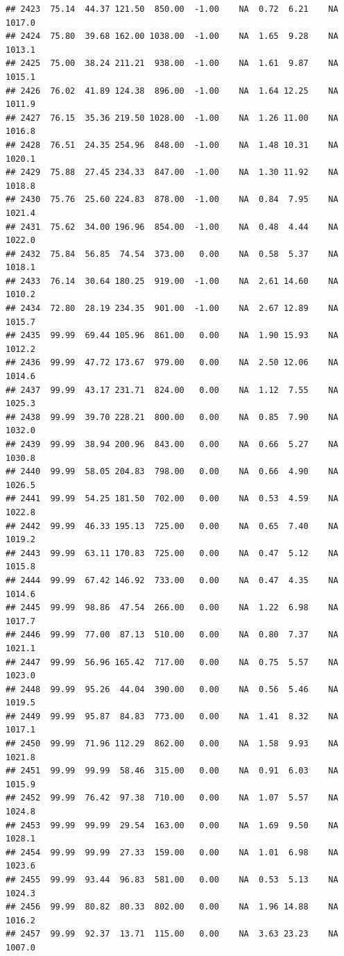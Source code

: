 \documentclass{article}\usepackage{graphicx, color}
\makeatletter
\newenvironment{kframe}{%
 \def\at@end@of@kframe{}%
 \ifinner\ifhmode%
  \def\at@end@of@kframe{\end{minipage}}%
  \begin{minipage}{\columnwidth}%
 \fi\fi%
 \def\FrameCommand##1{\hskip\@totalleftmargin \hskip-\fboxsep
 \colorbox{shadecolor}{##1}\hskip-\fboxsep
     \hskip-\linewidth \hskip-\@totalleftmargin \hskip\columnwidth}%
 \MakeFramed {\advance\hsize-\width
   \@totalleftmargin\z@ \linewidth\hsize
   \@setminipage}}%
 {\par\unskip\endMakeFramed%
 \at@end@of@kframe}
\newenvironment{knitrout}{}{} %
\makeatother
\begin{document}
\begin{knitrout}
\begin{kframe}
\begin{verbatim}
## 2423  75.14  44.37 121.50  850.00  -1.00    NA  0.72  6.21    NA 1017.0
## 2424  75.80  39.68 162.00 1038.00  -1.00    NA  1.65  9.28    NA 1013.1
## 2425  75.00  38.24 211.21  938.00  -1.00    NA  1.61  9.87    NA 1015.1
## 2426  76.02  41.89 124.38  896.00  -1.00    NA  1.64 12.25    NA 1011.9
## 2427  76.15  35.36 219.50 1028.00  -1.00    NA  1.26 11.00    NA 1016.8
## 2428  76.51  24.35 254.96  848.00  -1.00    NA  1.48 10.31    NA 1020.1
## 2429  75.88  27.45 234.33  847.00  -1.00    NA  1.30 11.92    NA 1018.8
## 2430  75.76  25.60 224.83  878.00  -1.00    NA  0.84  7.95    NA 1021.4
## 2431  75.62  34.00 196.96  854.00  -1.00    NA  0.48  4.44    NA 1022.0
## 2432  75.84  56.85  74.54  373.00   0.00    NA  0.58  5.37    NA 1018.1
## 2433  76.14  30.64 180.25  919.00  -1.00    NA  2.61 14.60    NA 1010.2
## 2434  72.80  28.19 234.35  901.00  -1.00    NA  2.67 12.89    NA 1015.7
## 2435  99.99  69.44 105.96  861.00   0.00    NA  1.90 15.93    NA 1012.2
## 2436  99.99  47.72 173.67  979.00   0.00    NA  2.50 12.06    NA 1014.6
## 2437  99.99  43.17 231.71  824.00   0.00    NA  1.12  7.55    NA 1025.3
## 2438  99.99  39.70 228.21  800.00   0.00    NA  0.85  7.90    NA 1032.0
## 2439  99.99  38.94 200.96  843.00   0.00    NA  0.66  5.27    NA 1030.8
## 2440  99.99  58.05 204.83  798.00   0.00    NA  0.66  4.90    NA 1026.5
## 2441  99.99  54.25 181.50  702.00   0.00    NA  0.53  4.59    NA 1022.8
## 2442  99.99  46.33 195.13  725.00   0.00    NA  0.65  7.40    NA 1019.2
## 2443  99.99  63.11 170.83  725.00   0.00    NA  0.47  5.12    NA 1015.8
## 2444  99.99  67.42 146.92  733.00   0.00    NA  0.47  4.35    NA 1014.6
## 2445  99.99  98.86  47.54  266.00   0.00    NA  1.22  6.98    NA 1017.7
## 2446  99.99  77.00  87.13  510.00   0.00    NA  0.80  7.37    NA 1021.1
## 2447  99.99  56.96 165.42  717.00   0.00    NA  0.75  5.57    NA 1023.0
## 2448  99.99  95.26  44.04  390.00   0.00    NA  0.56  5.46    NA 1019.5
## 2449  99.99  95.87  84.83  773.00   0.00    NA  1.41  8.32    NA 1017.1
## 2450  99.99  71.96 112.29  862.00   0.00    NA  1.58  9.93    NA 1021.8
## 2451  99.99  99.99  58.46  315.00   0.00    NA  0.91  6.03    NA 1015.9
## 2452  99.99  76.42  97.38  710.00   0.00    NA  1.07  5.57    NA 1024.8
## 2453  99.99  99.99  29.54  163.00   0.00    NA  1.69  9.50    NA 1028.1
## 2454  99.99  99.99  27.33  159.00   0.00    NA  1.01  6.98    NA 1023.6
## 2455  99.99  93.44  96.83  581.00   0.00    NA  0.53  5.13    NA 1024.3
## 2456  99.99  80.82  80.33  802.00   0.00    NA  1.96 14.88    NA 1016.2
## 2457  99.99  92.37  13.71  115.00   0.00    NA  3.63 23.23    NA 1007.0

\end{verbatim}
\end{kframe}
\end{knitrout}
\end{document}
